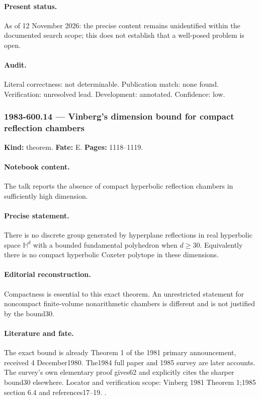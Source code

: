 \paragraph{Present status.} As of 12 November 2026: the precise content remains unidentified within the documented search scope; this does not establish that a well-posed problem is open.

\paragraph{Audit.} Literal correctness: not determinable. Publication match: none found. Verification: unresolved lead. Development: annotated. Confidence: low.

\subsubsection{1983-600.14 --- Vinberg's dimension bound for compact reflection chambers}

\label{item:1983-600.14}

\noindent\textbf{Kind:} theorem. \textbf{Fate:} E. \textbf{Pages:} 1118--1119.\par

\paragraph{Notebook content.} The talk reports the absence of compact hyperbolic reflection chambers in sufficiently high dimension.

\paragraph{Precise statement.} There is no discrete group generated by hyperplane reflections in real hyperbolic space \(\mathbb H^d\) with a bounded fundamental polyhedron when \(d\ge30\). Equivalently there is no compact hyperbolic Coxeter polytope in these dimensions.

\paragraph{Editorial reconstruction.} Compactness is essential to this exact theorem. An unrestricted statement for noncompact finite-volume nonarithmetic chambers is different and is not justified by the bound30.

\paragraph{Literature and fate.} The exact bound is already Theorem 1 of the 1981 primary announcement, received 4 December1980. The1984 full paper and 1985 survey are later accounts. The survey's own elementary proof gives62 and explicitly cites the sharper bound30 elsewhere. Locator and verification scope: Vinberg 1981 Theorem 1;1985 section 6.4 and references17--19. \cite{vinberg1981absence,vinberg1985hyperbolic}.

